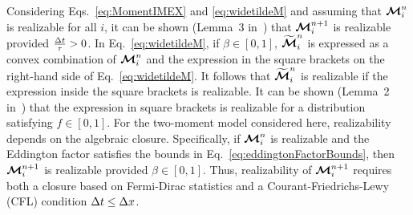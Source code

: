 Considering Eqs.~\eqref{eq:MomentIMEX} and \eqref{eq:widetildeM} and assuming that $\boldsymbol{\mathcal{M}}_{i}^{n}$ is realizable for all $i$, it can be shown (Lemma~3 in~\cite{chu_etal_2018}) that $\boldsymbol{\mathcal{M}}^{n+1}_{i}$ is realizable provided $\frac{\Delta t}{\tau} > 0$. 
In Eq.~\eqref{eq:widetildeM}, if $\beta \in [0,1]$, $\widetilde{\boldsymbol{\mathcal{M}}}^{n}_{i}$ is expressed as a convex combination of $\boldsymbol{\mathcal{M}}_{i}^{n}$ and the expression in the square brackets on the right-hand side of Eq.~\eqref{eq:widetildeM}.  
It follows that $\widetilde{\boldsymbol{\mathcal{M}}}^{n}_{i}$ is realizable if the expression inside the square brackets is realizable.  
It can be shown (Lemma~2 in~\cite{chu_etal_2018}) that the expression in square brackets is realizable for a distribution satisfying $f\in[0,1]$.  
For the two-moment model considered here, realizability depends on the algebraic closure.  
Specifically, if $\boldsymbol{\mathcal{M}}_{i}^{n}$ is realizable and the Eddington factor satisfies the bounds in Eq.~\eqref{eq:eddingtonFactorBounds}, then $\boldsymbol{\mathcal{M}}^{n+1}_{i}$ is realizable provided $\beta \in [0,1]$.  
Thus, realizability of $\boldsymbol{\mathcal{M}}^{n+1}_{i}$ requires both a closure based on Fermi-Dirac statistics and a Courant-Friedrichs-Lewy (CFL) condition $\Delta t\le\Delta x$.  